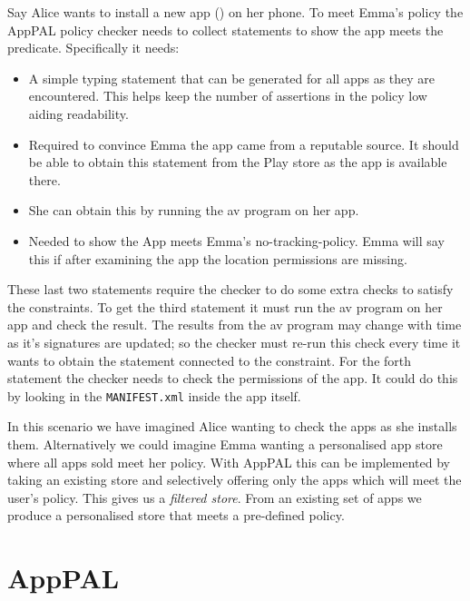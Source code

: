\documentclass[]{llncs}
\begin{document}
Say Alice wants to install a new app () on her phone.
To meet Emma's policy the AppPAL policy checker needs to collect statements to show the app meets the  predicate.
Specifically it needs:
\begin{itemize}
  \item{}
    A simple typing statement that can be generated for all apps as they are encountered.
    This helps keep the number of  assertions in the policy low aiding readability.
  \item{}
    Required to convince Emma the app came from a reputable source.
    It should be able to obtain this statement from the Play store as the app is available there.
  \item{}
    She can obtain this by running the \ac{av} program on her app.
  \item{}
    Needed to show the App meets Emma's no-tracking-policy.
    Emma will say this if after examining the app the location permissions are missing.
\end{itemize}
These last two statements require the checker to do some extra checks to satisfy the constraints.
To get the third statement it must run the \ac{av} program on her app and check the result.
The results from the \ac{av} program may change with time as it's signatures are updated;
  so the checker must re-run this check every time it wants to obtain the statement connected to the constraint.
For the forth statement the checker needs to check the permissions of the app.
It could do this by looking in the \texttt{MANIFEST.xml} inside the app itself.

In this scenario we have imagined Alice wanting to check the apps as she installs them.
Alternatively we could imagine Emma wanting a personalised app store where all apps sold meet her policy.
With AppPAL this can be implemented by taking an existing store and selectively offering only the apps which will meet the user's policy.
This gives us a \emph{filtered store}.
From an existing set of apps we produce a personalised store that meets a pre-defined policy.

\section{AppPAL}
\label{sec:details}
\end{document}
